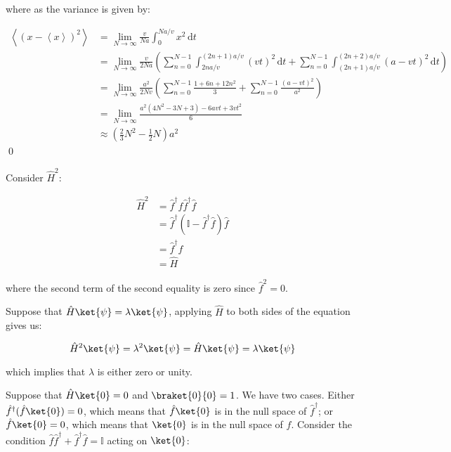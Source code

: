 \documentclass[12pt]{article}
\begin{document}
where as the variance is given by:

\begin{equation}
    \begin{split}
        \left\langle (x - \left\langle x \right\rangle)^{2} \right\rangle &= \lim_{N \to \infty} \frac{v}{Na} \int_{0}^{Na/v} x^{2} \, \mathrm{d}t \\
        &= \lim_{N \to \infty} \frac{v}{2Na} \left( \sum_{n = 0}^{N - 1} \int_{2na/v}^{(2n + 1)a/v} (vt)^{2} \, \mathrm{d}t + \sum_{n = 0}^{N - 1} \int_{(2n + 1)a/v}^{(2n + 2)a/v} (a - vt)^{2} \, \mathrm{d}t \right) \\
        &= \lim_{N \to \infty} \frac{a^{2}}{2Nv} \left( \sum_{n = 0}^{N - 1} \frac{1 + 6n + 12n^{2}}{3} + \sum_{n = 0}^{N - 1} \frac{(a - vt)^{2}}{a^{2}} \right) \\
        &= \lim_{N \to \infty} \frac{a^{2}(4N^{2} - 3N + 3) - 6avt + 3vt^{2}}{6} \\
        &\approx \left( \frac{2}{3} N^{2} - \frac{1}{2} N \right) a^{2}
    \end{split}
\end{equation}
\qed


Consider $\hat{H}^{2}$:

\begin{equation}
\begin{split}
    \hat{H}^{2} &= \hat{f}^{\dagger} \hat{f} \hat{f}^{\dagger} \hat{f} \\
    &= \hat{f}^{\dagger} (\mathbb{I} - \hat{f}^{\dagger} \hat{f}) \hat{f} \\
    &= \hat{f}^{\dagger} \hat{f} \\
    &= \hat{H}
\end{split}
\end{equation}

where the second term of the second equality is zero since $\hat{f}^{2} = 0$.

Suppose that $\hat{H} \ket{\psi} = \lambda \ket{\psi}$, applying $\hat{H}$ to both sides of the equation gives us:

\begin{equation}
    \hat{H}^{2} \ket{\psi} = \lambda^{2} \ket{\psi} = \hat{H} \ket{\psi} = \lambda \ket{\psi}
\end{equation}

which implies that $\lambda$ is either zero or unity.

Suppose that $\hat{H} \ket{0} = 0$ and $\braket{0}{0} = 1$. We have two cases. Either $\hat{f}^{\dagger} (\hat{f} \ket{0}) = 0$, which means that $\hat{f} \ket{0}$ is in the null space of $\hat{f}^{\dagger}$; or $\hat{f} \ket{0} = 0$, which means that $\ket{0}$ is in the null space of $\hat{f}$. Consider the condition $\hat{f} \hat{f}^{\dagger} + \hat{f}^{\dagger} \hat{f} = \mathbb{I}$ acting on $\ket{0}$:
\end{document}
